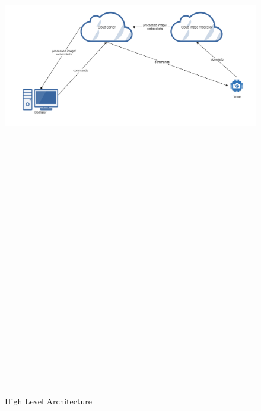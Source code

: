 \begin{figure}[ht]
    \label{fig:high-level-arch}
    \includegraphics[width=15cm, height=50cm,keepaspectratio]{img/overview.png}
    \caption{High Level Architecture}
\end{figure}

